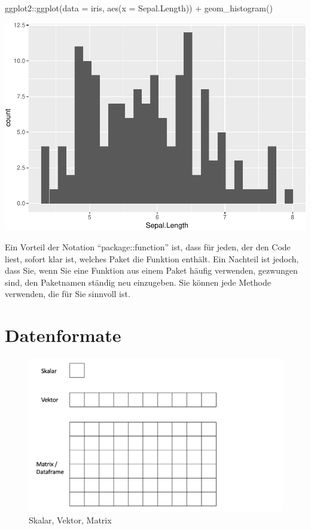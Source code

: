 \documentclass[
]{book}
\newenvironment{Shaded}{\begin{snugshade}}{\end{snugshade}}
\newcommand{\AttributeTok}[1]{\textcolor[rgb]{0.77,0.63,0.00}{#1}}
\newcommand{\FunctionTok}[1]{\textcolor[rgb]{0.00,0.00,0.00}{#1}}
\newcommand{\NormalTok}[1]{#1}
\newcommand{\SpecialCharTok}[1]{\textcolor[rgb]{0.00,0.00,0.00}{#1}}
\begin{document}
\begin{Shaded}
\begin{Highlighting}[]
\NormalTok{ggplot2}\SpecialCharTok{::}\FunctionTok{ggplot}\NormalTok{(}\AttributeTok{data =}\NormalTok{ iris, }\FunctionTok{aes}\NormalTok{(}\AttributeTok{x =}\NormalTok{ Sepal.Length)) }\SpecialCharTok{+} 
  \FunctionTok{geom\_histogram}\NormalTok{()}
\end{Highlighting}
\end{Shaded}

\includegraphics{CFH_R_bookdown_files/figure-latex/unnamed-chunk-7-1.pdf}

Ein Vorteil der Notation ``package::function'' ist, dass für jeden, der den Code liest, sofort klar ist, welches Paket die Funktion enthält. Ein Nachteil ist jedoch, dass Sie, wenn Sie eine Funktion aus einem Paket häufig verwenden, gezwungen sind, den Paketnamen ständig neu einzugeben. Sie können jede Methode verwenden, die für Sie sinnvoll ist.

\hypertarget{datenformate}{%
\chapter{Datenformate}\label{datenformate}}

\begin{figure}
\includegraphics[width=20.54in]{images/Datenformat_1} \caption{Skalar, Vektor, Matrix}\label{fig:unnamed-chunk-8}
\end{figure}
\end{document}
